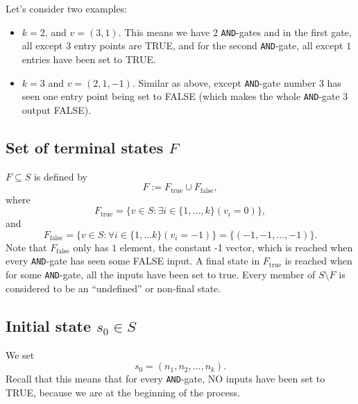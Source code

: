 \documentclass[12pt]{amsart}
\begin{document}
    Let's consider two examples:
    \begin{itemize}
        \item $k = 2$, and $v = (3,1)$. This means we have $2$ {\tt AND}-gates 
        and in the first gate, all except $3$ entry points are TRUE,
        and for the second {\tt AND}-gate, all except $1$ entries
        have been set to TRUE.
        \item $k= 3$ and $v = (2, 1, -1)$. Similar as above, except 
        {\tt AND}-gate number 3 has seen one entry point being set to FALSE 
        (which makes the whole {\tt AND}-gate 3 output FALSE). 
    \end{itemize}
    
\subsection{Set of terminal states  $F$} $F\subseteq S$ is defined by
    $$F:= F_{\text{true}} \cup F_{\text{false}},$$ where 
    $$F_{\text{true}} = \big\{v\in S: \exists i\in\{1,\ldots,k\}
    (v_i=0)\big\},$$
    and 
    $$F_{\text{false}} = \big\{v\in S: \forall i\in\{1,\ldots k\}
    (v_i = -1)\big\} = \big \{(-1,-1,\ldots,-1)\big\}.$$
    Note that $F_{\text{false}}$ only has $1$ element, the constant -1 vector, 
    which is reached when every {\tt AND}-gate has seen some FALSE 
    input. A final state in $F_{\text{true}}$ is reached when 
    for some {\tt AND}-gate, all the inputs have been set to true.
    Every member of $S\setminus F$ is considered to be an ``undefined'' 
    or non-final state.
\subsection{Initial state $s_0\in S$} We set $$s_0 = (n_1, n_2, \ldots, n_k).$$
Recall that this means that for every {\tt AND}-gate, NO inputs have been 
set to TRUE, because we are at the beginning of the process.
\end{document}
